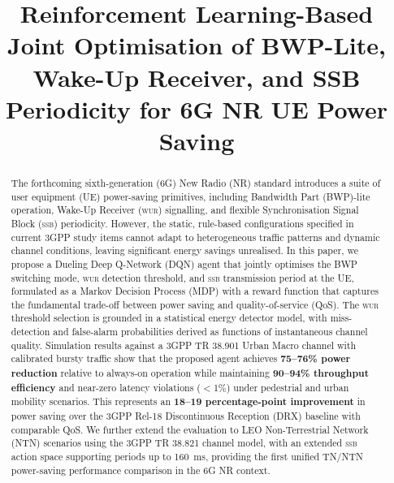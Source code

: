 \documentclass[conference]{IEEEtran}
\newcommand{\wur}{\textsc{wur}}
\newcommand{\ssb}{\textsc{ssb}}
\begin{document}
\title{Reinforcement Learning-Based Joint Optimisation of BWP-Lite,
Wake-Up Receiver, and SSB Periodicity for 6G NR UE Power Saving}

\author{
}

\maketitle

\begin{abstract}
The forthcoming sixth-generation (6G) New Radio (NR) standard introduces
a suite of user equipment (UE) power-saving primitives, including
Bandwidth Part (BWP)-lite operation, Wake-Up Receiver (\wur{}) signalling,
and flexible Synchronisation Signal Block (\ssb{}) periodicity.
However, the static, rule-based configurations specified in current 3GPP
study items cannot adapt to heterogeneous traffic patterns and dynamic
channel conditions, leaving significant energy savings unrealised.
In this paper, we propose a Dueling Deep Q-Network (DQN) agent that
jointly optimises the BWP switching mode, \wur{} detection threshold,
and \ssb{} transmission period at the UE, formulated as a Markov Decision
Process (MDP) with a reward function that captures the fundamental
trade-off between power saving and quality-of-service (QoS).
The \wur{} threshold selection is grounded in a statistical energy detector
model, with miss-detection and false-alarm probabilities derived as
functions of instantaneous channel quality.
Simulation results against a 3GPP TR 38.901 Urban Macro channel with
calibrated bursty traffic show that the proposed agent achieves
\textbf{75--76\% power reduction} relative to always-on operation
while maintaining \textbf{90--94\% throughput efficiency} and
near-zero latency violations ($<$1\%) under pedestrial and urban
mobility scenarios.
This represents an \textbf{18--19 percentage-point improvement} in
power saving over the 3GPP Rel-18 Discontinuous Reception (DRX) baseline
with comparable QoS.
We further extend the evaluation to LEO Non-Terrestrial Network (NTN)
scenarios using the 3GPP TR 38.821 channel model, with an extended
\ssb{} action space supporting periods up to 160~ms,
providing the first unified TN/NTN power-saving performance comparison
in the 6G NR context.
\end{abstract}
\end{document}
